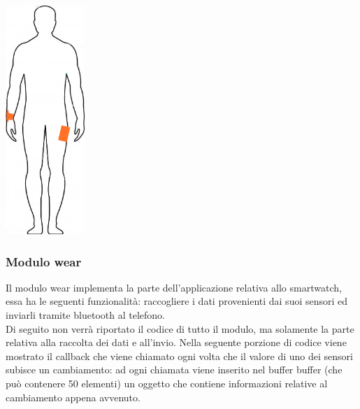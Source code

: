 \documentclass[a4paper]{article}
\begin{document}
\makebox[\linewidth]{}
\begin{minipage}{\linewidth}
\begin{center}
\includegraphics[width=30mm]{./images/sagoma_phone_watch.jpg} 
\makebox[\linewidth]{}
\end{center}
\end{minipage}
\makebox[\linewidth]{}
\makebox[\linewidth]{}


\subsubsection{Modulo wear}
Il modulo wear implementa la parte dell’applicazione relativa allo smartwatch, essa ha le seguenti funzionalità: raccogliere i dati provenienti dai suoi sensori ed inviarli tramite bluetooth al telefono.\\
Di seguito non verrà riportato il codice di tutto il modulo, ma solamente la parte relativa alla raccolta dei dati e all’invio.
Nella seguente porzione di codice viene mostrato il callback che viene chiamato ogni volta che il valore di uno dei sensori subisce un cambiamento: ad ogni chiamata viene inserito nel buffer buffer (che può contenere 50 elementi) un oggetto che contiene informazioni relative al cambiamento appena avvenuto.
\makebox[\linewidth]{}
\makebox[\linewidth]{}



\end{document}
